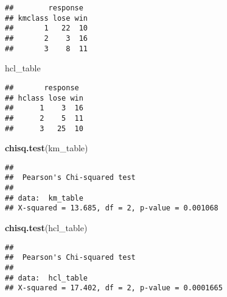 \documentclass[]{article}
\newenvironment{Shaded}{\begin{snugshade}}{\end{snugshade}}
\newcommand{\KeywordTok}[1]{\textcolor[rgb]{0.13,0.29,0.53}{\textbf{#1}}}
\newcommand{\NormalTok}[1]{#1}
\begin{document}
\begin{verbatim}
##        response
## kmclass lose win
##       1   22  10
##       2    3  16
##       3    8  11
\end{verbatim}

\begin{Shaded}
\begin{Highlighting}[]
\NormalTok{hcl_table}
\end{Highlighting}
\end{Shaded}

\begin{verbatim}
##       response
## hclass lose win
##      1    3  16
##      2    5  11
##      3   25  10
\end{verbatim}

\begin{Shaded}
\begin{Highlighting}[]
\KeywordTok{chisq.test}\NormalTok{(km_table)}
\end{Highlighting}
\end{Shaded}

\begin{verbatim}
## 
##  Pearson's Chi-squared test
## 
## data:  km_table
## X-squared = 13.685, df = 2, p-value = 0.001068
\end{verbatim}

\begin{Shaded}
\begin{Highlighting}[]
\KeywordTok{chisq.test}\NormalTok{(hcl_table)}
\end{Highlighting}
\end{Shaded}

\begin{verbatim}
## 
##  Pearson's Chi-squared test
## 
## data:  hcl_table
## X-squared = 17.402, df = 2, p-value = 0.0001665
\end{verbatim}
\end{document}
